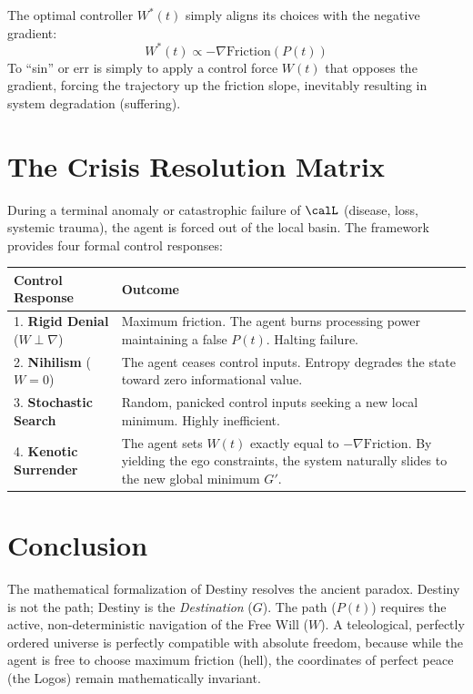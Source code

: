 \documentclass[12pt, a4paper]{article}
\theoremstyle{plain}
\theoremstyle{definition}
\begin{document}
The optimal controller $W^*(t)$ simply aligns its choices with the negative gradient:
\begin{equation}
    W^*(t) \propto -\nabla \text{Friction}(P(t))
\end{equation}
To ``sin'' or err is simply to apply a control force $W(t)$ that opposes the gradient, forcing the trajectory up the friction slope, inevitably resulting in system degradation (suffering).

\section{The Crisis Resolution Matrix}\label{sec:crisis}

During a terminal anomaly or catastrophic failure of $\calL$ (disease, loss, systemic trauma), the agent is forced out of the local basin. The framework provides four formal control responses:

\begin{center}
\begin{tabular}{lp{8cm}}
\toprule
\textbf{Control Response} & \textbf{Outcome} \\
\midrule
1. \textbf{Rigid Denial} ($W \perp \nabla$) & Maximum friction. The agent burns processing power maintaining a false $P(t)$. Halting failure. \\
2. \textbf{Nihilism} ($W = 0$) & The agent ceases control inputs. Entropy degrades the state toward zero informational value. \\
3. \textbf{Stochastic Search} & Random, panicked control inputs seeking a new local minimum. Highly inefficient. \\
4. \textbf{Kenotic Surrender} & The agent sets $W(t)$ exactly equal to $-\nabla \text{Friction}$. By yielding the ego constraints, the system naturally slides to the new global minimum $G'$. \\
\bottomrule
\end{tabular}
\end{center}

\section{Conclusion}

The mathematical formalization of Destiny resolves the ancient paradox. Destiny is not the path; Destiny is the \emph{Destination} ($G$). The path ($P(t)$) requires the active, non-deterministic navigation of the Free Will ($W$). A teleological, perfectly ordered universe is perfectly compatible with absolute freedom, because while the agent is free to choose maximum friction (hell), the coordinates of perfect peace (the Logos) remain mathematically invariant.
\end{document}
